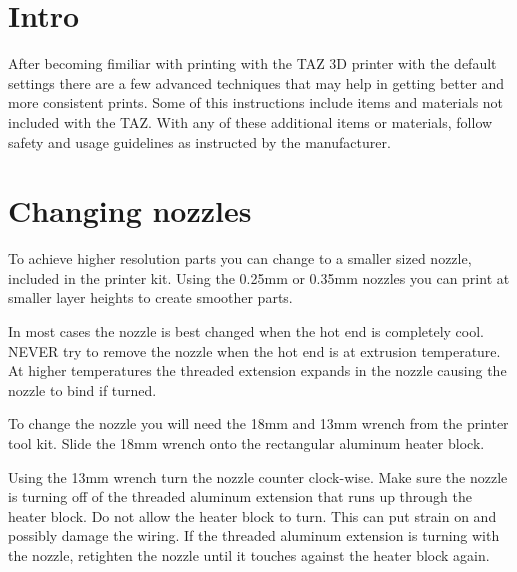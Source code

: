 \section{Intro}
After becoming fimiliar with printing with the TAZ 3D printer with the default settings there are a few advanced techniques that may help in getting better and more consistent prints. Some of this instructions include items and materials not included with the TAZ. With any of these additional items or materials, follow safety and usage guidelines as instructed by the manufacturer.

\section{Changing nozzles}
To achieve higher resolution parts you can change to a smaller sized nozzle, included in the printer kit. Using the 0.25mm or 0.35mm nozzles you can print at smaller layer heights to create smoother parts.

In most cases the nozzle is best changed when the hot end is completely cool. NEVER try to remove the nozzle when the hot end is at extrusion temperature. At higher temperatures the threaded extension expands in the nozzle causing the nozzle to bind if turned.

To change the nozzle you will need the 18mm and 13mm wrench from the printer tool kit. Slide the 18mm wrench onto the rectangular aluminum heater block.

Using the 13mm wrench turn the nozzle counter clock-wise. Make sure the nozzle is turning off of the threaded aluminum extension that runs up through the heater block. Do not allow the heater block to turn. This can put strain on and possibly damage the wiring. If the threaded aluminum extension is turning with the nozzle, retighten the nozzle until it touches against the heater block again.


